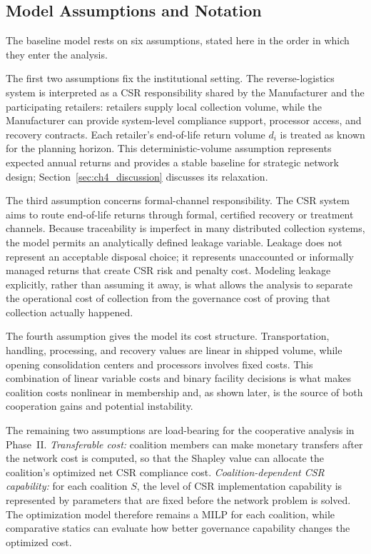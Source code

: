 \subsection{Model Assumptions and Notation}
\label{sec:notation}

The baseline model rests on six assumptions, stated here in the order in which they enter the analysis.

The first two assumptions fix the institutional setting. The reverse-logistics system is interpreted as a CSR responsibility shared by the Manufacturer and the participating retailers: retailers supply local collection volume, while the Manufacturer can provide system-level compliance support, processor access, and recovery contracts. Each retailer's end-of-life return volume $d_i$ is treated as known for the planning horizon. This deterministic-volume assumption represents expected annual returns and provides a stable baseline for strategic network design; Section~\ref{sec:ch4_discussion} discusses its relaxation.

The third assumption concerns formal-channel responsibility. The CSR system aims to route end-of-life returns through formal, certified recovery or treatment channels. Because traceability is imperfect in many distributed collection systems, the model permits an analytically defined leakage variable. Leakage does not represent an acceptable disposal choice; it represents unaccounted or informally managed returns that create CSR risk and penalty cost. Modeling leakage explicitly, rather than assuming it away, is what allows the analysis to separate the operational cost of collection from the governance cost of proving that collection actually happened.

The fourth assumption gives the model its cost structure. Transportation, handling, processing, and recovery values are linear in shipped volume, while opening consolidation centers and processors involves fixed costs. This combination of linear variable costs and binary facility decisions is what makes coalition costs nonlinear in membership and, as shown later, is the source of both cooperation gains and potential instability.

The remaining two assumptions are load-bearing for the cooperative analysis in Phase~II. \emph{Transferable cost:} coalition members can make monetary transfers after the network cost is computed, so that the Shapley value can allocate the coalition's optimized net CSR compliance cost. \emph{Coalition-dependent CSR capability:} for each coalition $S$, the level of CSR implementation capability is represented by parameters that are fixed before the network problem is solved. The optimization model therefore remains a MILP for each coalition, while comparative statics can evaluate how better governance capability changes the optimized cost.


